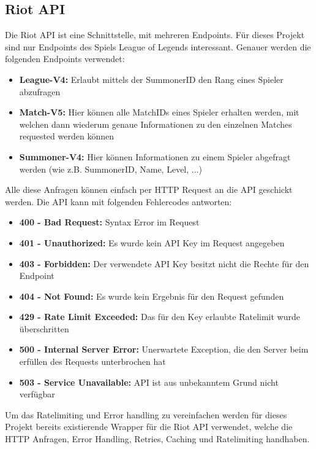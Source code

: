 \subsection{Riot API}\label{riot-api-libraries}
Die Riot API ist eine Schnittstelle, mit mehreren Endpoints. Für dieses Projekt sind nur Endpoints des Spiels League of Legends interessant. Genauer werden die folgenden Endpoints verwendet:
\begin{itemize}
\item \textbf{League-V4:} Erlaubt mittels der SummonerID den Rang eines Spieler abzufragen
\item \textbf{Match-V5:} Hier können alle MatchIDs eines Spieler erhalten werden, mit welchen dann wiederum genaue Informationen zu den einzelnen Matches requested werden können
\item \textbf{Summoner-V4:} Hier können Informationen zu einem Spieler abgefragt werden (wie z.B. SummonerID, Name, Level, ...)
\end{itemize}
Alle diese Anfragen können einfach per HTTP Request an die API geschickt werden.
Die API kann mit folgenden Fehlercodes antworten:
\begin{itemize}
\item \textbf{400 - Bad Request:} Syntax Error im Request
\item \textbf{401 - Unauthorized:} Es wurde kein API Key im Request angegeben
\item \textbf{403 - Forbidden:} Der verwendete API Key besitzt nicht die Rechte für den Endpoint
\item \textbf{404 - Not Found:} Es wurde kein Ergebnis für den Request gefunden
\item \textbf{429 - Rate Limit Exceeded:} Das für den Key erlaubte Ratelimit wurde überschritten
\item \textbf{500 - Internal Server Error:} Unerwartete Exception, die den Server beim erfüllen des Requests unterbrochen hat
\item \textbf{503 - Service Unavailable:} API ist aus unbekanntem Grund nicht verfügbar 
\end{itemize}
Um das Ratelimiting und Error handling zu vereinfachen werden für dieses Projekt bereits existierende Wrapper für die Riot API verwendet, welche die HTTP Anfragen, Error Handling, Retries, Caching und Ratelimiting handhaben.
